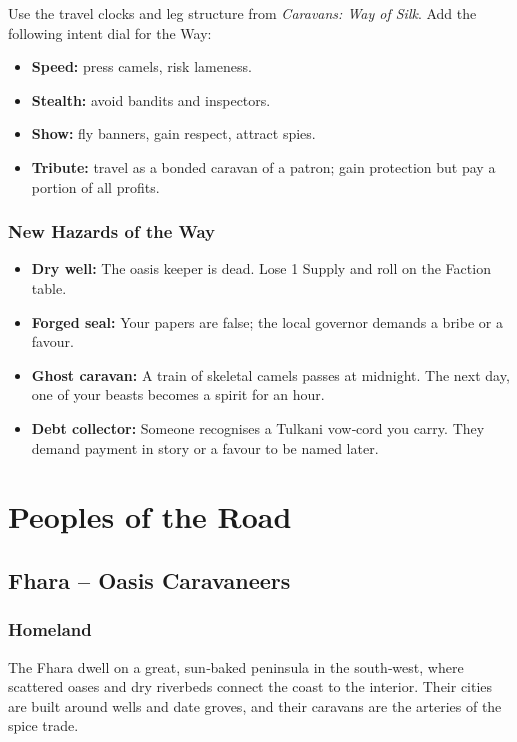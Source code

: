 \documentclass[11pt]{book}
\begin{document}
Use the travel clocks and leg structure from \textit{Caravans: Way of Silk}. Add the following intent dial for the Way:

\begin{itemize}
    \item \textbf{Speed:} press camels, risk lameness.
    \item \textbf{Stealth:} avoid bandits and inspectors.
    \item \textbf{Show:} fly banners, gain respect, attract spies.
    \item \textbf{Tribute:} travel as a bonded caravan of a patron; gain protection but pay a portion of all profits.
\end{itemize}

\subsection*{New Hazards of the Way}
\begin{itemize}
    \item \textbf{Dry well:} The oasis keeper is dead. Lose 1 Supply and roll on the Faction table.
    \item \textbf{Forged seal:} Your papers are false; the local governor demands a bribe or a favour.
    \item \textbf{Ghost caravan:} A train of skeletal camels passes at midnight. The next day, one of your beasts becomes a spirit for an hour.
    \item \textbf{Debt collector:} Someone recognises a Tulkani vow‑cord you carry. They demand payment in story or a favour to be named later.
\end{itemize}

\clearpage
\chapter{Peoples of the Road}

\section{Fhara -- Oasis Caravaneers}
\subsection*{Homeland}
The Fhara dwell on a great, sun‑baked peninsula in the south‑west, where scattered oases and dry riverbeds connect the coast to the interior. Their cities are built around wells and date groves, and their caravans are the arteries of the spice trade.
\end{document}
